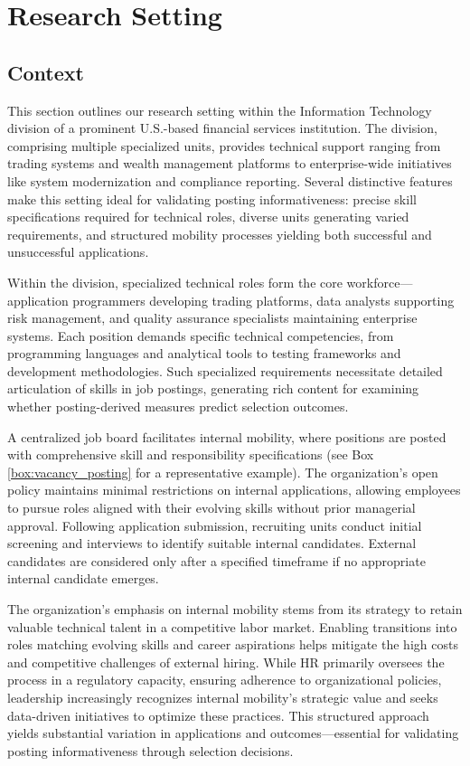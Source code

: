 \section{Research Setting}\label{sec:research_setting}

\subsection{Context}

This section outlines our research setting within the Information Technology division of a prominent U.S.-based 
financial services institution. The division, comprising multiple specialized units, provides technical support 
ranging from trading systems and wealth management platforms to enterprise-wide initiatives like system 
modernization and compliance reporting. Several distinctive features make this setting ideal for validating 
posting informativeness: precise skill specifications required for technical roles, diverse units generating 
varied requirements, and structured mobility processes yielding both successful and unsuccessful applications.

Within the division, specialized technical roles form the core workforce—application programmers developing 
trading platforms, data analysts supporting risk management, and quality assurance specialists maintaining 
enterprise systems. Each position demands specific technical competencies, from programming languages and 
analytical tools to testing frameworks and development methodologies. Such specialized requirements necessitate 
detailed articulation of skills in job postings, generating rich content for examining whether posting-derived 
measures predict selection outcomes.

A centralized job board facilitates internal mobility, where positions are posted with comprehensive skill 
and responsibility specifications (see Box \ref{box:vacancy_posting} for a representative example). The 
organization's open policy maintains minimal restrictions on internal applications, allowing employees to 
pursue roles aligned with their evolving skills without prior managerial approval. Following application 
submission, recruiting units conduct initial screening and interviews to identify suitable internal candidates. 
External candidates are considered only after a specified timeframe if no appropriate internal candidate emerges.

The organization's emphasis on internal mobility stems from its strategy to retain valuable technical talent 
in a competitive labor market. Enabling transitions into roles matching evolving skills and career aspirations 
helps mitigate the high costs and competitive challenges of external hiring. While HR primarily oversees the 
process in a regulatory capacity, ensuring adherence to organizational policies, leadership increasingly 
recognizes internal mobility's strategic value and seeks data-driven initiatives to optimize these practices. 
This structured approach yields substantial variation in applications and outcomes—essential for validating 
posting informativeness through selection decisions.

